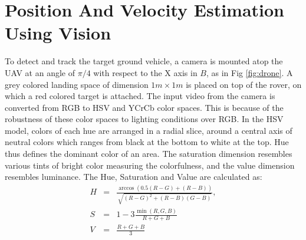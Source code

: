 \documentclass[conf]{new-aiaa}
\begin{document}
\section{Position And Velocity Estimation Using Vision}\label{sec:vision}
To detect and track the target ground vehicle, a camera is mounted atop the UAV at an angle of $\pi/4$ with respect to the X axis in $B$, as in Fig \ref{fig:drone}. A grey colored landing space of dimension $1m\times1m$ is placed on top of the rover, on which a red colored target is attached. The input video from the camera is converted from RGB to HSV and YCrCb color spaces. This is because of the robustness of these color spaces to lighting conditions over RGB. In the HSV model, colors of each hue are arranged in a radial slice, around a central axis of neutral colors which ranges from black at the bottom to white at the top. Hue thus defines the dominant color of an area. The saturation dimension resembles various tints of bright color measuring the colorfulness, and the value dimension resembles luminance. The Hue, Saturation and Value are calculated as:
\begin{eqnarray}
H &=& \frac{\arccos(0.5(R-G)+(R-B))}{\sqrt{(R-G)^{2} + (R-B)(G-B)}},\\
S &=& 1-3\frac{\min(R,G,B)}{R+G+B}\\
V &=& \frac{R+G+B}{3}
\end{eqnarray}
\end{document}
